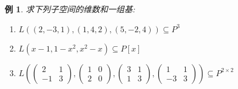 \documentclass[13pt]{beamer}
\newtheorem{exa}{例}
\begin{document}
\begin{frame}
\begin{exa}
	求下列子空间的维数和一组基:
	\begin{enumerate}
		\item $L((2,-3,1),(1,4,2),(5,-2,4)) \subseteq P^{3}$
		\item $L\left(x-1,1-x^{2}, x^{2}-x\right) \subseteq P[x]$
		\item $L\left(\left(\begin{array}{cc}2 & 1 \\ -1 & 3\end{array}\right),\left(\begin{array}{ll}1 & 0 \\ 2 & 0\end{array}\right),\left(\begin{array}{ll}3 & 1 \\ 1 & 3\end{array}\right),\left(\begin{array}{cc}1 & 1 \\ -3 &
		3\end{array}\right)\right) \subseteq P^{2 \times 2}$
	\end{enumerate}
	
\end{exa}
\end{frame}
\end{document}
